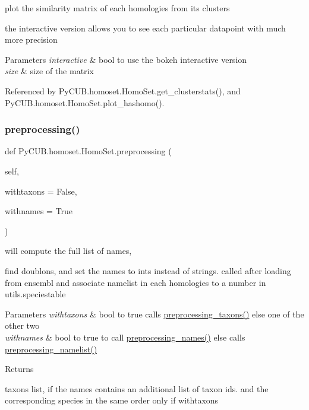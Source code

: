 plot the similarity matrix of each homologies from its clusters 

the interactive version allows you to see each particular datapoint with much more precision


\begin{DoxyParams}{Parameters}
{\em interactive} & bool to use the bokeh interactive version \\
\hline
{\em size} & size of the matrix \\
\hline
\end{DoxyParams}


Referenced by Py\+C\+U\+B.\+homoset.\+Homo\+Set.\+get\+\_\+clusterstats(), and Py\+C\+U\+B.\+homoset.\+Homo\+Set.\+plot\+\_\+hashomo().

\mbox{\label{class_py_c_u_b_1_1homoset_1_1_homo_set_a3f689e03251e7b4fe262a86d08946998}} 
\subsubsection{\texorpdfstring{preprocessing()}{preprocessing()}}
{\footnotesize\ttfamily def Py\+C\+U\+B.\+homoset.\+Homo\+Set.\+preprocessing (\begin{DoxyParamCaption}\item[{}]{self,  }\item[{}]{withtaxons = {\ttfamily False},  }\item[{}]{withnames = {\ttfamily True} }\end{DoxyParamCaption})}



will compute the full list of names, 

find doublons, and set the names to ints instead of strings. called after loading from ensembl and associate namelist in each homologies to a number in utils.\+speciestable


\begin{DoxyParams}{Parameters}
{\em withtaxons} & bool to true calls \mbox{\hyperlink{class_py_c_u_b_1_1homoset_1_1_homo_set_aa39455620288b4912e5540491913e792}{preprocessing\+\_\+taxons()}} else one of the other two \\
\hline
{\em withnames} & bool to true to call \mbox{\hyperlink{class_py_c_u_b_1_1homoset_1_1_homo_set_a36cf71a7bc24b788c4d526591a8ec376}{preprocessing\+\_\+names()}} else calls \mbox{\hyperlink{class_py_c_u_b_1_1homoset_1_1_homo_set_a4060c440127aa861c17b6157c81e2d27}{preprocessing\+\_\+namelist()}}\\
\hline
\end{DoxyParams}
\begin{DoxyReturn}{Returns}


taxons list, if the names contains an additional list of taxon ids. and the corresponding species in the same order only if withtaxons 
\end{DoxyReturn}


